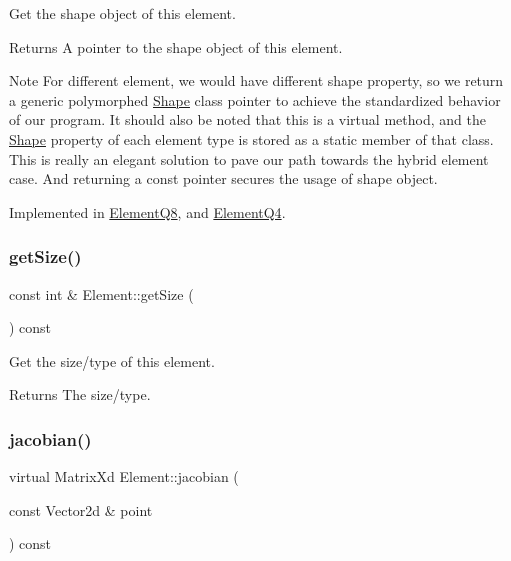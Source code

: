 Get the shape object of this element. 

\begin{DoxyReturn}{Returns}
A pointer to the shape object of this element.
\end{DoxyReturn}
\begin{DoxyNote}{Note}
For different element, we would have different shape property, so we return a generic polymorphed \mbox{\hyperlink{class_shape}{Shape}} class pointer to achieve the standardized behavior of our program. It should also be noted that this is a virtual method, and the \mbox{\hyperlink{class_shape}{Shape}} property of each element type is stored as a static member of that class. This is really an elegant solution to pave our path towards the hybrid element case. And returning a const pointer secures the usage of shape object. 
\end{DoxyNote}


Implemented in \mbox{\hyperlink{class_element_q8_a06118e8d0c0a0cb247c249f22e11eeaf}{Element\+Q8}}, and \mbox{\hyperlink{class_element_q4_a3e2b762e838f20a10c184f55d3d4ff85}{Element\+Q4}}.

\mbox{\label{class_element_a0221b246d9ca632136cc39790c46ee8f}} 
\subsubsection{\texorpdfstring{get\+Size()}{getSize()}}
{\footnotesize\ttfamily const int \& Element\+::get\+Size (\begin{DoxyParamCaption}{ }\end{DoxyParamCaption}) const}



Get the size/type of this element. 

\begin{DoxyReturn}{Returns}
The size/type. 
\end{DoxyReturn}
\mbox{\label{class_element_ad469c745f0bcb9d7a3431b1608c1ade6}} 
\subsubsection{\texorpdfstring{jacobian()}{jacobian()}}
{\footnotesize\ttfamily virtual Matrix\+Xd Element\+::jacobian (\begin{DoxyParamCaption}\item[{const Vector2d \&}]{point }\end{DoxyParamCaption}) const\hspace{0.3cm}{\ttfamily [pure virtual]}}



